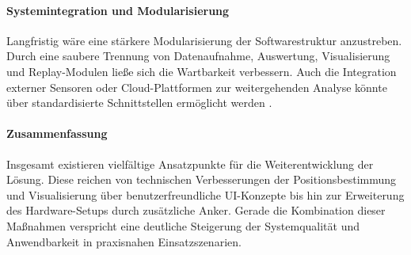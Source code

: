 \documentclass[a4paper, 12pt]{article} %
\begin{document}
\paragraph{Systemintegration und Modularisierung}
Langfristig wäre eine stärkere Modularisierung der Softwarestruktur anzustreben. Durch eine saubere Trennung von Datenaufnahme, Auswertung, 
Visualisierung und Replay-Modulen ließe sich die Wartbarkeit verbessern. Auch die Integration externer Sensoren oder Cloud-Plattformen zur 
weitergehenden Analyse könnte über standardisierte Schnittstellen ermöglicht werden \cite{software_architecture_modular}.

\paragraph{Zusammenfassung}
Insgesamt existieren vielfältige Ansatzpunkte für die Weiterentwicklung der Lösung. Diese reichen von technischen Verbesserungen der 
Positionsbestimmung und Visualisierung über benutzerfreundliche \ac{UI}-Konzepte bis hin zur Erweiterung des Hardware-Setups durch zusätzliche Anker. 
Gerade die Kombination dieser Maßnahmen verspricht eine deutliche Steigerung der Systemqualität und Anwendbarkeit in praxisnahen Einsatzszenarien.

\begingroup
\sloppy
\nocite{*}
\printbibliography
\end{document}
